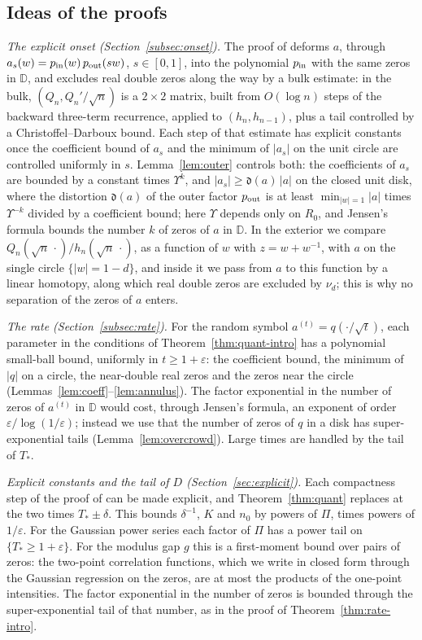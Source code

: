 \documentclass[11pt]{amsart}
\theoremstyle{definition}
\theoremstyle{remark}
\numberwithin{equation}{section}
\newcommand{\D}{\mathbb{D}}
\newcommand{\eps}{\varepsilon}
\begin{document}
\subsection{Ideas of the proofs}
\emph{The explicit onset (Section~\ref{subsec:onset}).} The proof of \cite[Theorem~\ref{M-thm:main}]{Main} deforms $a$, through $a_s(w)=p_{\rm in}(w)\,p_{\rm out}(sw)$, $s\in[0,1]$, into the polynomial $p_{\rm in}$ with the same zeros in $\D$, and excludes real double zeros along the way by a bulk estimate: in the bulk, $(Q_n,Q_n'/\sqrt n)$ is a $2\times2$ matrix, built from $O(\log n)$ steps of the backward three-term recurrence, applied to $(h_n,h_{n-1})$, plus a tail controlled by a Christoffel--Darboux bound. Each step of that estimate has explicit constants once the coefficient bound of $a_s$ and the minimum of $|a_s|$ on the unit circle are controlled uniformly in $s$. Lemma~\ref{lem:outer} controls both: the coefficients of $a_s$ are bounded by a constant times $\Upsilon^k$, and $|a_s|\ge\mathfrak d(a)\,|a|$ on the closed unit disk, where the distortion $\mathfrak d(a)$ of the outer factor $p_{\rm out}$ is at least $\min_{|w|=1}|a|$ times $\Upsilon^{-k}$ divided by a coefficient bound; here $\Upsilon$ depends only on $R_0$, and Jensen's formula bounds the number $k$ of zeros of $a$ in $\D$. In the exterior we compare $Q_n(\sqrt n\,\cdot)/h_n(\sqrt n\,\cdot)$, as a function of $w$ with $z=w+w^{-1}$, with $a$ on the single circle $\{|w|=1-d\}$, and inside it we pass from $a$ to this function by a linear homotopy, along which real double zeros are excluded by $\nu_d$; this is why no separation of the zeros of $a$ enters.

\emph{The rate (Section~\ref{subsec:rate}).} For the random symbol $a^{(t)}=q(\cdot/\sqrt t)$, each parameter in the conditions of Theorem~\ref{thm:quant-intro} has a polynomial small-ball bound, uniformly in $t\ge1+\eps$: the coefficient bound, the minimum of $|q|$ on a circle, the near-double real zeros and the zeros near the circle (Lemmas~\ref{lem:coeff}--\ref{lem:annulus}). The factor exponential in the number of zeros of $a^{(t)}$ in $\D$ would cost, through Jensen's formula, an exponent of order $\eps/\log(1/\eps)$; instead we use that the number of zeros of $q$ in a disk has super-exponential tails (Lemma~\ref{lem:overcrowd}). Large times are handled by the tail of $T_*$.

\emph{Explicit constants and the tail of $D$ (Section~\ref{sec:explicit}).} Each compactness step of the proof of \cite[Theorem~\ref{M-thm:collision}]{Main} can be made explicit, and Theorem~\ref{thm:quant} replaces \cite[Theorem~\ref{M-thm:main}]{Main} at the two times $T_*\pm\delta$. This bounds $\delta^{-1}$, $K$ and $n_0$ by powers of $\Pi$, times powers of $1/\eps$. For the Gaussian power series each factor of $\Pi$ has a power tail on $\{T_*\ge1+\eps\}$. For the modulus gap $g$ this is a first-moment bound over pairs of zeros: the two-point correlation functions, which we write in closed form through the Gaussian regression on the zeros, are at most the products of the one-point intensities. The factor exponential in the number of zeros is bounded through the super-exponential tail of that number, as in the proof of Theorem~\ref{thm:rate-intro}.
\end{document}

